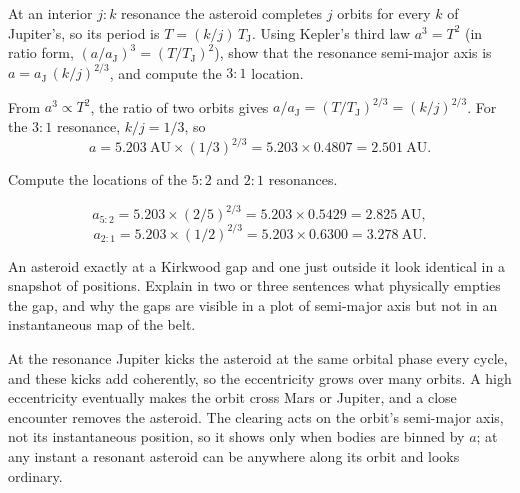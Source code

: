 \parti At an interior $j\!:\!k$ resonance the asteroid completes $j$ orbits for every $k$ of Jupiter's, so its period is $T = (k/j)\,T_\mathrm{J}$. Using Kepler's third law $a^3 = T^2$ (in ratio form, $(a/a_\mathrm{J})^3 = (T/T_\mathrm{J})^2$), show that the resonance semi-major axis is $a = a_\mathrm{J}\,(k/j)^{2/3}$, and compute the $3\!:\!1$ location.

\begin{solution}
From $a^3 \propto T^2$, the ratio of two orbits gives $a/a_\mathrm{J} = (T/T_\mathrm{J})^{2/3} = (k/j)^{2/3}$.
For the $3\!:\!1$ resonance, $k/j = 1/3$, so
\[
a = 5.203\ \mathrm{AU} \times (1/3)^{2/3} = 5.203 \times 0.4807 = 2.501\ \mathrm{AU}.
\]
\end{solution}

\parti Compute the locations of the $5\!:\!2$ and $2\!:\!1$ resonances.

\begin{solution}
\[
a_{5:2} = 5.203 \times (2/5)^{2/3} = 5.203 \times 0.5429 = 2.825\ \mathrm{AU},
\]
\[
a_{2:1} = 5.203 \times (1/2)^{2/3} = 5.203 \times 0.6300 = 3.278\ \mathrm{AU}.
\]
\end{solution}

\parti An asteroid exactly at a Kirkwood gap and one just outside it look identical in a snapshot of positions. Explain in two or three sentences what physically empties the gap, and why the gaps are visible in a plot of semi-major axis but not in an instantaneous map of the belt.

\begin{solution}
At the resonance Jupiter kicks the asteroid at the same orbital phase every cycle, and these kicks add coherently, so the eccentricity grows over many orbits.
A high eccentricity eventually makes the orbit cross Mars or Jupiter, and a close encounter removes the asteroid.
The clearing acts on the orbit's semi-major axis, not its instantaneous position, so it shows only when bodies are binned by $a$; at any instant a resonant asteroid can be anywhere along its orbit and looks ordinary.
\end{solution}
